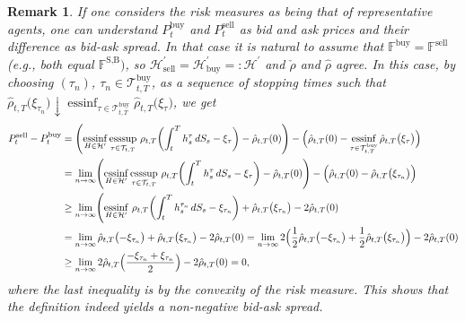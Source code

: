 \documentclass{article}
\DeclareMathOperator*{\essinf}{ess inf}
\DeclareMathOperator*{\esssup}{ess sup}
\newtheorem{remark}[definition]{Remark}
\begin{document}
\begin{remark}\label{rem:spread}
	If one considers the risk measures as being that of representative agents, one can understand $P_t^\text{buy}$ and $P_t^\text{sell}$ as bid and ask prices and their
	difference as bid-ask spread. In that case it is natural to assume that $\mathbb{F}^\text{buy} = \mathbb{F}^\text{sell}$ (e.g., both equal $\mathbb{F}^\text{S,B})$, so
	$\mathcal H^\prime_{\text{sell}} = \mathcal H^\prime_{\text{buy}} =: \mathcal H^\prime$ and $\check{\rho}$ and $\hat{\rho}$ agree. In this case, by choosing 
	$(\tau_n)$, $\tau_n \in \mathcal{T}_{t,T}^\text{buy}$, as a sequence of stopping times such that
	$ \hat{\rho}_{t,T} \bigl( \xi_{\tau_n}\bigr) \downarrow \essinf_{\tau \in \mathcal{T}_{t,T}^\text{buy}} \hat{\rho}_{t,T} \bigl( \xi_\tau\bigr)$, we get 
	\begin{align*}
		P_t^\text{sell} - P_t^\text{buy}  & = \Biggl(\essinf_{H\in \mathcal H^\prime}\esssup_{\tau\in \mathcal T_{t,T}}\, \rho_{t,T}\biggl(\int_t^T h_s^\tau \,  dS_s -
		\xi_{\tau}\biggr) - \hat{\rho}_{t,T} ( 0) \Biggr) - \Bigl( \hat{\rho}_{t,T} ( 0) - \essinf_{\tau \in \mathcal{T}_{t,T}^\text{buy}}
		\hat{\rho}_{t,T} \bigl( \xi_\tau\bigr)\Bigr)\\
		& = \lim_{n \to \infty}\Biggl(\essinf_{H\in \mathcal H^\prime}\esssup_{\tau\in \mathcal T_{t,T}}\, \rho_{t,T}\biggl(\int_t^T h_s^\tau \,  dS_s -\xi_{\tau}\biggr) - 
		\hat{\rho}_{t,T} ( 0) \Biggr) - \Bigl( \hat{\rho}_{t,T} ( 0) - \hat{\rho}_{t,T} \bigl( \xi_{\tau_n}\bigr)\Bigr)\\
		& \geq \lim_{n \to \infty} \Biggl(\essinf_{H\in \mathcal H^\prime}\, \rho_{t,T}\biggl(\int_t^T h_s^{\tau_n} \,  dS_s -\xi_{\tau_n}\biggr)  + \hat{\rho}_{t,T}
		\bigl( \xi_{\tau_n} \bigr) - 2\hat{\rho}_{t,T} ( 0) \\
		& = \lim_{n \to \infty}  \hat{\rho}_{t,T}\bigl(-\xi_{\tau_n}\bigr)  + \hat{\rho}_{t,T} \bigl( \xi_{\tau_n} \bigr) - 2\hat{\rho}_{t,T} ( 0) = \lim_{n \to \infty}  
		2 \Bigl( \frac{1}{2}\hat{\rho}_{t,T}\bigl(-\xi_{\tau_n}\bigr)  + \frac{1}{2}\hat{\rho}_{t,T} \bigl( \xi_{\tau_n} \bigr)\Bigr) - 2\hat{\rho}_{t,T} ( 0)\\
		& \geq \lim_{n \to \infty}  2 \hat{\rho}_{t,T}\Bigl(\frac{-\xi_{\tau_n}+ \xi_{\tau_n}}{2} \Bigr) - 2\hat{\rho}_{t,T} ( 0) =0, 
	\end{align*}
where the last inequality is by the convexity of the risk measure. This shows that the definition indeed yields a non-negative bid-ask spread.
\end{remark}
\end{document}
